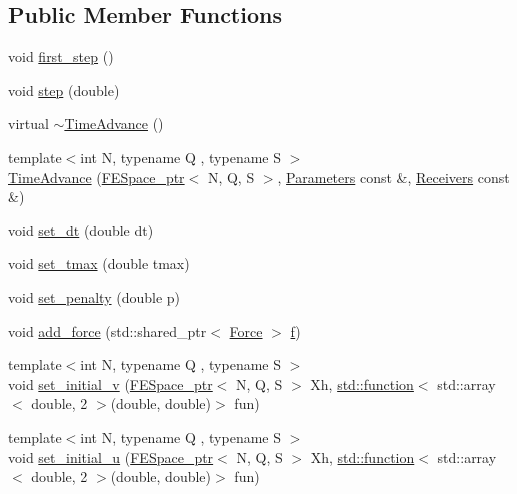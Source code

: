 \subsection*{Public Member Functions}
\begin{DoxyCompactItemize}
\item 
void \hyperlink{classTspeed_1_1TimeAdvance_ae9d353495c283af5a29740a70424f11d}{first\-\_\-step} ()
\item 
void \hyperlink{classTspeed_1_1TimeAdvance_a68853509e7ceecbe34d79518530eee7b}{step} (double)
\item 
virtual \hyperlink{classTspeed_1_1TimeAdvance_a73dfdea3bdb8e9f33e7223399ac9f14c}{$\sim$\-Time\-Advance} ()
\item 
{\footnotesize template$<$int N, typename Q , typename S $>$ }\\\hyperlink{classTspeed_1_1TimeAdvance_a0ab9c0637d3de35291c4f845dba713fe}{Time\-Advance} (\hyperlink{namespaceTspeed_a05fcb57094666c8f5ab1e90d1a6fecf8}{F\-E\-Space\-\_\-ptr}$<$ N, Q, S $>$, \hyperlink{classTspeed_1_1Parameters}{Parameters} const \&, \hyperlink{classTspeed_1_1Receivers}{Receivers} const \&)
\item 
void \hyperlink{classTspeed_1_1TimeAdvance_a2538fb7b6ee62103de78f42158bf38e6}{set\-\_\-dt} (double dt)
\item 
void \hyperlink{classTspeed_1_1TimeAdvance_ac0d8cd9b2b704e7cd4a2dd0793ce085d}{set\-\_\-tmax} (double tmax)
\item 
void \hyperlink{classTspeed_1_1TimeAdvance_af635a6b3e94ff39467817c4b3890feb4}{set\-\_\-penalty} (double p)
\item 
void \hyperlink{classTspeed_1_1TimeAdvance_a248fe5d89a8bff234c84bac80ed31adf}{add\-\_\-force} (std\-::shared\-\_\-ptr$<$ \hyperlink{classTspeed_1_1Force}{Force} $>$ \hyperlink{classTspeed_1_1TimeAdvance_a36dea2ae6ba03546806bbacb83697c01}{f})
\item 
{\footnotesize template$<$int N, typename Q , typename S $>$ }\\void \hyperlink{classTspeed_1_1TimeAdvance_a5565d8938d39054dbceae8b5fb26f6bc}{set\-\_\-initial\-\_\-v} (\hyperlink{namespaceTspeed_a05fcb57094666c8f5ab1e90d1a6fecf8}{F\-E\-Space\-\_\-ptr}$<$ N, Q, S $>$ Xh, \hyperlink{vtk__vector__out_8m_a6235d6cebbf2f77ca6dbae2811d86530}{std\-::function}$<$ std\-::array$<$ double, 2 $>$(double, double)$>$ fun)
\item 
{\footnotesize template$<$int N, typename Q , typename S $>$ }\\void \hyperlink{classTspeed_1_1TimeAdvance_a458fb8edb53992055aceb6fee44f506a}{set\-\_\-initial\-\_\-u} (\hyperlink{namespaceTspeed_a05fcb57094666c8f5ab1e90d1a6fecf8}{F\-E\-Space\-\_\-ptr}$<$ N, Q, S $>$ Xh, \hyperlink{vtk__vector__out_8m_a6235d6cebbf2f77ca6dbae2811d86530}{std\-::function}$<$ std\-::array$<$ double, 2 $>$(double, double)$>$ fun)

\end{DoxyCompactItemize}
